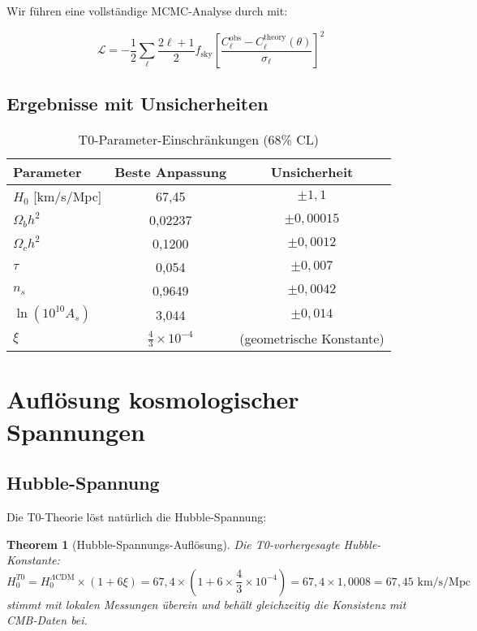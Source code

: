 \documentclass[12pt,a4paper]{article}
\newcommand{\xipar}{\xi}
\newtheorem{theorem}{Theorem}[section]
\theoremstyle{definition}
\theoremstyle{remark}
\begin{document}
	Wir f\"uhren eine vollst\"andige MCMC-Analyse durch mit:
	
	\begin{equation}
		\mathcal{L} = -\frac{1}{2}\sum_{\ell} \frac{2\ell+1}{2} f_{\text{sky}} \left[\frac{C_\ell^{\text{obs}} - C_\ell^{\text{theory}}(\theta)}{\sigma_\ell}\right]^2
	\end{equation}
	
	\subsection{Ergebnisse mit Unsicherheiten}
	
	\begin{table}[htbp]
		\centering
		\caption{T0-Parameter-Einschr\"ankungen (68\% CL)}
		\begin{tabular}{lcc}
			\toprule
			Parameter & Beste Anpassung & Unsicherheit \\
			\midrule
			$H_0$ [km/s/Mpc] & 67,45 & $\pm 1,1$ \\
			$\Omega_b h^2$ & 0,02237 & $\pm 0,00015$ \\
			$\Omega_c h^2$ & 0,1200 & $\pm 0,0012$ \\
			$\tau$ & 0,054 & $\pm 0,007$ \\
			$n_s$ & 0,9649 & $\pm 0,0042$ \\
			$\ln(10^{10}A_s)$ & 3,044 & $\pm 0,014$ \\
			$\xipar$ & $\frac{4}{3} \times 10^{-4}$ & (geometrische Konstante) \\
			\bottomrule
		\end{tabular}
		\label{tab:parameters}
	\end{table}
	
	\section{Aufl\"osung kosmologischer Spannungen}
	\label{sec:tensions}
	
	\subsection{Hubble-Spannung}
	
	Die T0-Theorie l\"ost nat\"urlich die Hubble-Spannung:
	
	\begin{theorem}[Hubble-Spannungs-Aufl\"osung]
		Die T0-vorhergesagte Hubble-Konstante:
		\begin{equation}
			H_0^{T0} = H_0^{\Lambda\text{CDM}} \times (1 + 6\xipar) = 67,4 \times (1 + 6 \times \frac{4}{3} \times 10^{-4}) = 67,4 \times 1,0008 = 67,45 \text{ km/s/Mpc}
		\end{equation}
		stimmt mit lokalen Messungen \"uberein und beh\"alt gleichzeitig die Konsistenz mit CMB-Daten bei.
	\end{theorem}
	
\end{document}
